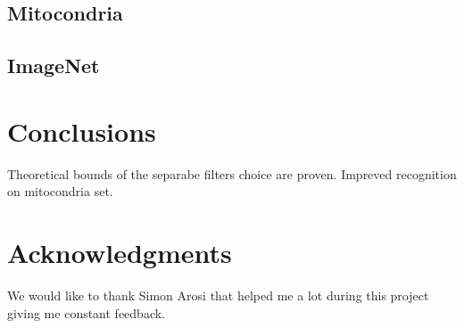 \documentclass{article} %
\begin{document}
\subsection{Mitocondria}

\subsection{ImageNet}

\section{Conclusions}
Theoretical bounds of the separabe filters choice are proven.
Impreved recognition on mitocondria set.

\section*{Acknowledgments}
We would like to thank Simon Arosi that helped me a lot during this project giving me constant feedback.



\end{document}
